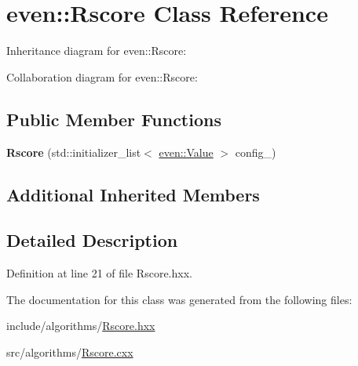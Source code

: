 \hypertarget{classeven_1_1_rscore}{}\section{even\+:\+:Rscore Class Reference}
\label{classeven_1_1_rscore}


Inheritance diagram for even\+:\+:Rscore\+:


Collaboration diagram for even\+:\+:Rscore\+:
\subsection*{Public Member Functions}
\begin{DoxyCompactItemize}
\item 
\mbox{\label{classeven_1_1_rscore_a4890bd2928927486091cf4dfbb65bab3}} 
{\bfseries Rscore} (std\+::initializer\+\_\+list$<$ \mbox{\hyperlink{classeven_1_1_value}{even\+::\+Value}} $>$ config\+\_\+)
\end{DoxyCompactItemize}
\subsection*{Additional Inherited Members}


\subsection{Detailed Description}


Definition at line 21 of file Rscore.\+hxx.



The documentation for this class was generated from the following files\+:\begin{DoxyCompactItemize}
\item 
include/algorithms/\mbox{\hyperlink{_rscore_8hxx}{Rscore.\+hxx}}\item 
src/algorithms/\mbox{\hyperlink{_rscore_8cxx}{Rscore.\+cxx}}\end{DoxyCompactItemize}
